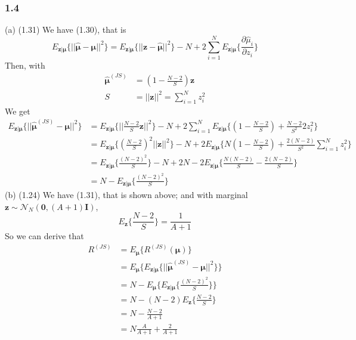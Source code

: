 \documentclass{article}\usepackage{graphicx, color}
\begin{document}
\subsubsection*{1.4}
(a) (1.31) \newline
We have (1.30), that is
\begin{displaymath}
E_{\bm{z|\mu}} \{||\hat{\bm{\mu}} - \bm{\mu}||^2\} 
= E_{\bm{z|\mu}} \{||\bm{z} - \hat{\bm{\mu}}||^2\} - N 
+ 2\sum_{i=1}^N E_{\bm{z|\mu}}\{\frac{\partial \hat{\mu}_i}{\partial z_i}\}
\end{displaymath}
Then, with 
\begin{displaymath}
\begin{split}
\hat{\bm{\mu}}^{(JS)} &= (1 - \frac{N-2}{S}) \bm{z} \\
S &=||\bm{z}||^2= \sum_{i=1}^N z_i^2
\end{split}
\end{displaymath}
We get
\begin{displaymath}
\begin{split}
E_{\bm{z|\mu}} \{||\hat{\bm{\mu}}^{(JS)} - \bm{\mu}||^2\} 
& =  E_{\bm{z|\mu}} \{||\frac{N-2}{S} \bm{z}||^2\} - N + 2\sum_{i=1}^N
E_{\bm{z|\mu}} \{(1-\frac{N-2}{S}) + \frac{N-2}{S^2} 2z_i^2 \}  \\
& = E_{\bm{z|\mu}} \{(\frac{N-2}{S})^2 ||\bm{z}||^2\} - N + 
2 E_{\bm{z|\mu}} \{N(1-\frac{N-2}{S}) + \frac{2(N-2)}{S^2} \sum_{i=1}^N z_i^2\} \\
& = E_{\bm{z|\mu}} \{\frac{(N-2)^2}{S} \} - N + 2N -
2 E_{\bm{z|\mu}} \{\frac{N(N-2)}{S} - \frac{2(N-2)}{S} \} \\
& = N - E_{\bm{z|\mu}} \{\frac{(N-2)^2}{S} \}
\end{split}
\end{displaymath}
(b) (1.24) \newline
We have (1.31), that is shown above; and with marginal 
$\bm{z} \sim \mathcal{N}_N(\bm{0},(A+1)\bm{I})$, 
\begin{displaymath}
E_{\bm{z}} \{ \frac{N-2}{S} \} = \frac{1}{A+1}
\end{displaymath}
So we can derive that
\begin{displaymath}
\begin{split}
R^{(JS)} & = E_{\bm{\mu}} \{ R^{(JS)} (\bm{\mu}) \} \\
& = E_{\bm{\mu}} \{ E_{\bm{z|\mu}} \{||\hat{\bm{\mu}}^{(JS)} - \bm{\mu}||^2\} \} \\
& = N - E_{\bm{\mu}} \{ E_{\bm{z|\mu}} \{ \frac{(N-2)^2}{S} \} \} \\
& = N - (N-2) E_{\bm{z}} \{ \frac{N-2}{S} \} \\
& = N - \frac{N-2}{A+1}  \\
& = N \frac{A}{A+1} + \frac{2}{A+1}
\end{split}
\end{displaymath}
\end{document}
